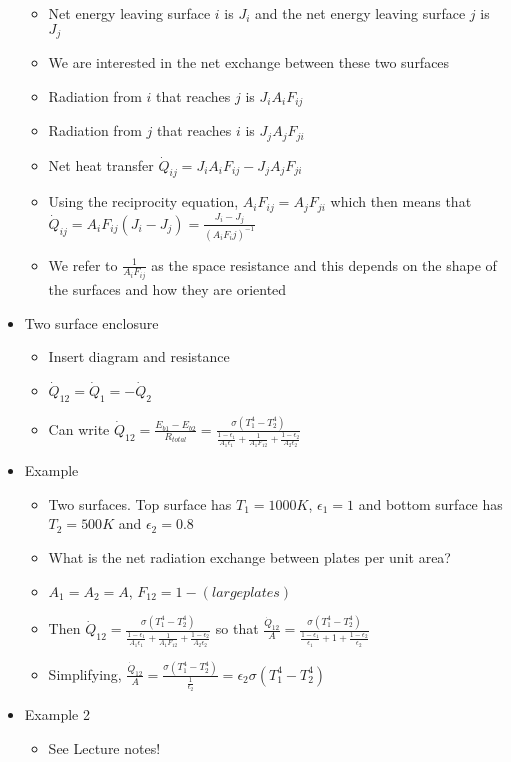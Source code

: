 \documentclass[12pt]{article}
\begin{document}
\begin{itemize}
\begin{itemize}
        \item Net energy leaving surface $i$ is $J_i$ and the net energy leaving surface $j$ is $J_j$
        \item We are interested in the net exchange between these two surfaces
        \item Radiation from $i$ that reaches $j$ is $J_i A_i F_{ij}$
        \item Radiation from $j$ that reaches $i$ is $J_j A_j F_{ji}$
        \item Net heat transfer $\dot{Q}_{ij} = J_i A_i F_{ij} - J_j A_j F_{ji}$
        \item Using the reciprocity equation, $A_i F_{ij} = A_j F_{ji}$ which then means that $\dot{Q}_{ij} = A_i F_{ij} (J_i - J_j) = \frac{J_i - J_j}{(A_i F_i j)^{-1}}$
        \item We refer to $\frac{1}{A_i F_{ij}}$ as the space resistance and this depends on the shape of the surfaces and how they are oriented
    \end{itemize}
    \item Two surface enclosure \begin{itemize}
        \item Insert diagram and resistance
        \item $\dot{Q}_{12}  = \dot{Q}_1 = - \dot{Q}_2$
        \item Can write $\dot{Q}_{12} = \frac{E_{b1} - E_{b2}}{R_{total}} = \frac{\sigma(T_1^4 - T_2^4)}{\frac{1-\epsilon_1}{A_1 \epsilon_1} + \frac{1}{A_1 F_{12}} + \frac{1- \epsilon_2}{A_2 \epsilon_2}}$
    \end{itemize}
    \item Example \begin{itemize}
        \item Two surfaces. Top surface has $T_1 = 1000 K$, $\epsilon_1 = 1$ and bottom surface has $T_2 = 500 K$ and $\epsilon_2 = 0.8$
        \item What is the net radiation exchange between plates per unit area? 
        \item $A_1 = A_2 = A$, $F_{12} = 1 - (large plates)$
        \item Then $\dot{Q}_{12} = \frac{\sigma(T_1^4 - T_2^4)}{\frac{1-\epsilon_1}{A_1 \epsilon_1} + \frac{1}{A_1 F_{12}} + \frac{1- \epsilon_2}{A_2 \epsilon_2}}$ so that $\frac{\dot{Q}_{12}}{A} = \frac{\sigma(T_1^4 - T_2^4)}{\frac{1-\epsilon_1}{\epsilon_1} + 1 + \frac{1- \epsilon_2}{\epsilon_2}}$
        \item Simplifying, $\frac{\dot{Q}_{12}}{A} = \frac{\sigma(T_1^4 - T_2^4)}{\frac{1}{\epsilon_2}} = \epsilon_2 \sigma (T_1^4 - T_2^4)$
    \end{itemize}
    \item Example 2 \begin{itemize}
        \item See Lecture notes!
    \end{itemize}
\end{itemize}
\end{document}
